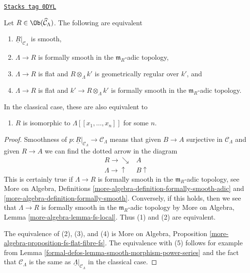 \begin{lemma}[Smooth]
\label{formal-defos-lemma-smooth}
\href{https://stacks.math.columbia.edu/tag/0DYL}{\texttt{Stacks tag 0DYL}}

Let $R \in \Ob(\widehat{\mathcal{C}}_\Lambda)$. The following are
equivalent
\begin{enumerate}
\item $\underline{R}|_{\mathcal{C}_\Lambda}$ is smooth,
\item $\Lambda \to R$ is formally smooth in the $\mathfrak m_R$-adic topology,
\item $\Lambda \to R$ is flat and $R \otimes_\Lambda k'$ is
geometrically regular over $k'$, and
\item $\Lambda \to R$ is flat and $k' \to R \otimes_\Lambda k'$ is
formally smooth in the $\mathfrak m_R$-adic topology.
\end{enumerate}
In the classical case, these are also equivalent to
\begin{enumerate}
\item[(5)] $R$ is isomorphic to $\Lambda[[x_1, \ldots, x_n]]$
for some $n$.
\end{enumerate}
\end{lemma}

\begin{proof}
Smoothness of
$p : \underline{R}|_{\mathcal{C}_\Lambda} \to \mathcal{C}_\Lambda$
means that given $B \to A$ surjective in $\mathcal{C}_\Lambda$
and given $R \to A$ we can find the dotted arrow in the
diagram
$$
\begin{array}{cc}R \longrightarrow\searrow & A \\ \Lambda \longrightarrow\uparrow & B \uparrow\end{array}
$$
This is certainly true if $\Lambda \to R$ is formally smooth in the
$\mathfrak m_R$-adic topology, see
More on Algebra, Definitions
\ref{more-algebra-definition-formally-smooth-adic} and
\ref{more-algebra-definition-formally-smooth}.
Conversely, if this holds, then we see that
$\Lambda \to R$ is formally smooth in the $\mathfrak m_R$-adic
topology by More on Algebra, Lemma \ref{more-algebra-lemma-fs-local}.
Thus (1) and (2) are equivalent.

\medskip\noindent
The equivalence of (2), (3), and (4) is
More on Algebra, Proposition \ref{more-algebra-proposition-fs-flat-fibre-fs}.
The equivalence with (5) follows for example from
Lemma \ref{formal-defos-lemma-smooth-morphism-power-series}
and the fact that $\mathcal{C}_\Lambda$ is the same
as $\underline{\Lambda}|_{\mathcal{C}_\Lambda}$ in the classical case.
\end{proof}


